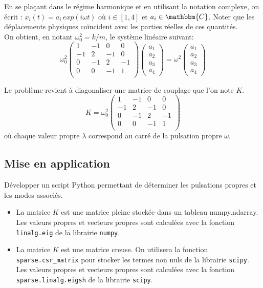 \documentclass[a4paper, 10pt]{article}
\begin{document}
En se plaçant dans le régime harmonique et en utilisant
la notation complexe, on écrit : $x_i(t)=a_i \, exp(i\omega t)$ où $i \in [1, 4]$ et $a_i \in \mathbbm{C}$.
Noter que les déplacements physiques coïncident avec les parties réelles de ces quantités.\\

On obtient, en notant ${\omega_0^2}=k/m$, le système linéaire suivant:
$$
{\omega_0^2}
\left(
\begin{array}{rrrr}
1   & -1 & 0  & 0  \\
-1  & 2 & -1 & 0 \\
0  & -1 & 2 & -1 \\
0  & 0 & -1 & 1 \\
\end{array}
\right)
\left(
\begin{array}{c}
a_1 \\ a_2 \\ a_3 \\ a_4
\end{array}
\right)=
{\omega^2}
\left(
\begin{array}{c}
a_1 \\ a_2 \\ a_3 \\ a_4
\end{array}
\right) 
$$

Le problème revient à diagonaliser une matrice de couplage que l'on note $K$. 
$$
K=
{\omega_0^2}
\left(
\begin{array}{rrrr}
1   & -1 & 0  & 0  \\
-1  & 2 & -1 & 0 \\
0  & -1 & 2 & -1 \\
0  & 0 & -1 & 1 \\
\end{array}
\right)
$$
où chaque valeur propre  $\lambda$ correspond au carré de la pulsation propre ${\omega}$.

\subsection{Mise en application}

Développer un script Python permettant de déterminer les pulsations propres et les modes associés.
\begin{itemize}
\item La matrice $K$ est une matrice pleine stockée dans un tableau numpy.ndarray.
Les valeurs propres et vecteurs propres sont calculées avec la fonction {\tt linalg.eig} de la librairie {\tt numpy}.
\item La matrice $K$ est une matrice creuse.
On utilisera la fonction {\tt sparse.csr\_matrix} pour stocker les termes non nuls de la
librairie {\tt scipy}.
Les valeurs propres et vecteurs propres sont calculées avec la fonction {\tt sparse.linalg.eigsh} de la librairie {\tt scipy}.
\end{itemize}
\end{document}
